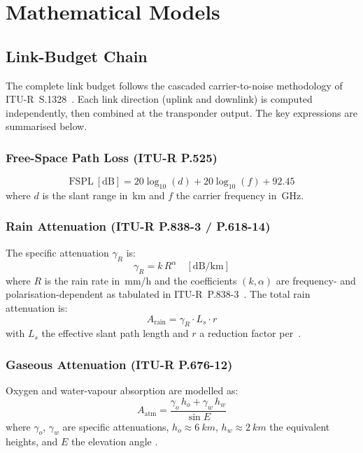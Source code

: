 \documentclass[conference]{IEEEtran}
\begin{document}
\section{Mathematical Models}
\label{sec:models}

\subsection{Link-Budget Chain}

The complete link budget follows the cascaded carrier-to-noise methodology
of ITU-R~S.1328~\cite{itu_s1328}.  Each link direction (uplink and
downlink) is computed independently, then combined at the transponder
output.  The key expressions are summarised below.

\subsubsection{Free-Space Path Loss (ITU-R P.525)}
\begin{equation}
  \text{FSPL}~[\text{dB}] = 20\log_{10}(d) + 20\log_{10}(f) + 92.45
  \label{eq:fspl}
\end{equation}
where $d$ is the slant range in~km and $f$ the carrier frequency in~GHz.

\subsubsection{Rain Attenuation (ITU-R P.838-3 / P.618-14)}
The specific attenuation $\gamma_R$ is:
\begin{equation}
  \gamma_R = k\,R^{\alpha} \quad [\text{dB/km}]
  \label{eq:rain_specific}
\end{equation}
where $R$ is the rain rate in~mm/h and the coefficients $(k,\alpha)$ are
frequency- and polarisation-dependent as tabulated in
ITU-R~P.838-3~\cite{itu_p838}.  The total rain attenuation is:
\begin{equation}
  A_{\text{rain}} = \gamma_R \cdot L_s \cdot r
  \label{eq:rain_total}
\end{equation}
with $L_s$ the effective slant path length and $r$ a reduction factor
per~\cite{itu_p618}.

\subsubsection{Gaseous Attenuation (ITU-R P.676-12)}
Oxygen and water-vapour absorption are modelled as:
\begin{equation}
  A_{\text{atm}} = \frac{\gamma_o\,h_o + \gamma_w\,h_w}{\sin E}
  \label{eq:gas}
\end{equation}
where $\gamma_o$, $\gamma_w$ are specific attenuations, $h_o \approx
\SI{6}{km}$, $h_w \approx \SI{2}{km}$ the equivalent heights, and $E$
the elevation angle \cite{itu_p676}.
\end{document}
